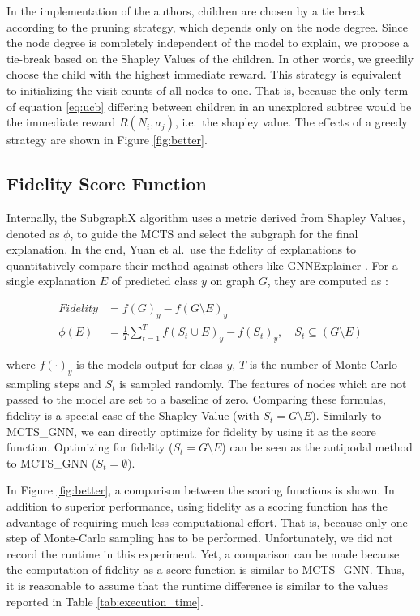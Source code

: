 In the implementation of the authors, children are chosen by a tie break according to the pruning strategy, which depends only on the node degree.
Since the node degree is completely independent of the model to explain, we propose a tie-break based on the Shapley Values of the children.
In other words, we greedily choose the child with the highest immediate reward.
This strategy is equivalent to initializing the visit counts of all nodes to one.
That is, because the only term of equation \ref{eq:ucb} differing between children in an unexplored subtree would be the immediate reward $R(N_i, a_j)$, i.e.\ the shapley value.
The effects of a greedy strategy are shown in Figure \ref{fig:better}.


\subsection{Fidelity Score Function}
Internally, the SubgraphX algorithm uses a metric derived from Shapley Values, denoted as $\phi$, to guide the MCTS and select the subgraph for the final explanation. 
In the end, Yuan et al.\ use the fidelity of explanations to quantitatively compare their method against others like GNNExplainer \cite{Ying19}. 
For a single explanation $E$ of predicted class $y$ on graph $G$, they are computed as \cite{Yuan21}:

\begin{align}
\mathit{Fidelity} &= f(G)_{y} - f(G\setminus E)_{y} \\
\phi(E) &= \frac{1}{T} \sum_{t=1}^{T} f(S_t \cup E)_{y} - f(S_t)_{y}, \quad S_t \subseteq (G \setminus E)
\end{align}

where $f(\cdot)_y$ is the models output for class $y$, $T$ is the number of Monte-Carlo sampling steps and $S_t$ is sampled randomly. 
The features of nodes which are not passed to the model are set to a baseline of zero. 
Comparing these formulas, fidelity is a special case of the Shapley Value (with $S_t = G \setminus E$). 
Similarly to MCTS\_GNN, we can directly optimize for fidelity by using it as the score function. 
Optimizing for fidelity ($S_t = G \setminus E$) can be seen as the antipodal method to MCTS\_GNN ($S_t = \emptyset$).

In Figure \ref{fig:better}, a comparison between the scoring functions is shown. 
In addition to superior performance, using fidelity as a scoring function has the advantage of requiring much less computational effort. 
That is, because only one step of Monte-Carlo sampling has to be performed. 
Unfortunately, we did not record the runtime in this experiment. 
Yet, a comparison can be made because the computation of fidelity as a score function is similar to MCTS\_GNN.
Thus, it is reasonable to assume that the runtime difference is similar to the values reported in Table \ref{tab:execution_time}.

